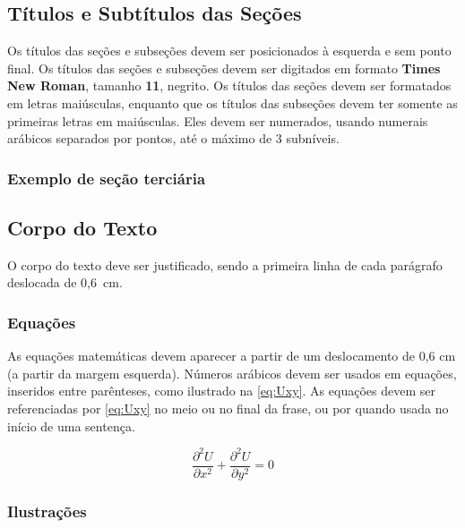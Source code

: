 \documentclass[%
  article,%
  a4paper,%
  11pt,%
  fleqn,%
  oneside,%
  chapter = TITLE,%
  section = TITLE,%
]{abntex2}
\begin{document}
\subsection{Títulos e Subtítulos das Seções}\label{ssec:tit}

{\color{red} Os títulos das seções e subseções devem ser posicionados à esquerda e sem ponto final.  
Os títulos das seções e subseções devem ser digitados em formato \textbf{Times New Roman}, tamanho \textbf{11}, negrito.
Os títulos das seções devem ser formatados em letras maiúsculas, enquanto que os títulos das subseções devem ter somente as primeiras letras em maiúsculas.
Eles devem ser numerados, usando numerais arábicos separados por pontos, até o máximo de 3 subníveis.

\subsubsection{Exemplo de seção terciária}
}

\subsection{Corpo do Texto}\label{ssec:corpo}

{\color{red} O corpo do texto deve ser justificado, sendo a primeira linha de cada parágrafo deslocada de 0,6~cm. }

\subsubsection{Equações}\label{sssec:eqs}
{\color{red} As equações matemáticas devem aparecer a partir de um deslocamento de 0,6 cm (a partir da margem esquerda). Números arábicos devem ser usados em equações, inseridos entre parênteses, como ilustrado na \cref{eq:Uxy}.
As equações devem ser referenciadas por \cref{eq:Uxy} no meio ou no final da frase, ou por  quando usada no início de uma sentença.

\begin{equation}\label{eq:Uxy}
\frac{\partial^2 U}{\partial x^2} + \frac{\partial^2 U}{\partial y^2} = 0
\end{equation}

}
\subsubsection{Ilustrações}\label{sssec:figs}
\end{document}
